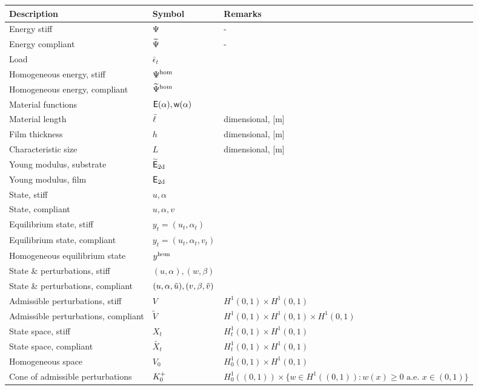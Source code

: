 \begin{table}[h!]
  \centering
  \begin{tabular}{  m{5.5cm}  m{3cm}  m{6cm}  }
    \hline
    \textbf{Description} & \textbf{Symbol} & \textbf{Remarks} \\
    \hline
    Energy stiff     & $\Psi$ & - \\
    Energy compliant & $\widetilde\Psi$ & - \\
    Load & $\bar\epsilon_t$ & \\
    Homogeneous energy, stiff   & $\Psi^\text{hom}$ & \\
    Homogeneous energy, compliant   & $\widetilde\Psi^\text{hom}$ & \\
    Material functions &  $\mathsf E(\alpha), \mathsf{w}(\alpha)$ & \\
    Material length & $\bar{\ell}$ & dimensional, [m]\\
    Film thickness & $h$ & dimensional, [m]\\
    Characteristic size & $L$ & dimensional, [m]\\
    Young modulus, substrate & ${\mathsf{\widetilde E_{\text{2d}}}}$ & \\
    Young modulus, film & $\mathsf{E_{\text{2d}}}$ & \\
    State, stiff& $u, \alpha$ & \\
    State, compliant& $u, \alpha, v$ & \\
    Equilibrium state, stiff& $y_t=(u_t, \alpha_t)$ & \\
    Equilibrium state, compliant & $y_t=(u_t, \alpha_t, v_t)$ & \\
    Homogeneous equilibrium state  & $y^{\text{hom}}$ & \\
    State \& perturbations, stiff & $(u,\alpha), (w, \beta)$ & \\
    State \& perturbations, compliant & $(u, \alpha, \tilde u), (v, \beta, \tilde v)$ & \\
    Admissible perturbations, stiff& $V$ & $H^1(0,1)\times  H^1(0,1)$\\
    Admissible perturbations, compliant& $\widetilde{V}$ & $H^1(0,1)\times  H^1(0,1)\times  H^1(0,1)$\\
    State space, stiff& $X_t$ & $H^1_t(0,1)\times  H^1(0,1)$\\
    State space, compliant& $\widetilde{X_t}$ & $H^1_t(0,1)\times  H^1(0,1)$\\
    Homogeneous space& $V_0$ & $H^1_0(0,1)\times  H^1(0,1)$\\
    Cone of admissible perturbations& $K^+_{0}$ & $H^1_0((0, 1))\times \{w \in H^1((0, 1)): w(x) \geq 0 \text{ a.e. }x\in (0, 1)\}$\\

\end{tabular}
\end{table}
